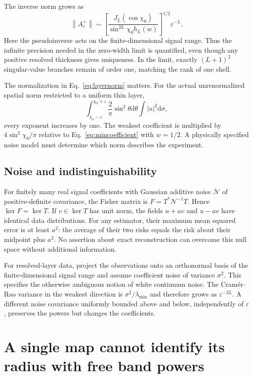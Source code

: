 \documentclass[aps,prd,reprint,amsmath,amssymb,nofootinbib,
longbibliography]{revtex4-2}
\newcommand{\dd}{\mathrm d}
\newcommand{\ee}{\varepsilon}
\newcommand{\norm}[1]{\left\lVert#1\right\rVert}
\begin{document}
The inverse norm grows as
\begin{equation}
 \norm{A_\ee^+}\sim
 \left[\frac{J_L(\cos\chi_0)}{\sin^{2L}\chi_0h_L(w)}\right]^{1/2}
 \ee^{-L}.
 \label{eq:inversecost}
\end{equation}
Here the pseudoinverse acts on the finite-dimensional signal range.
Thus the infinite precision needed in the zero-width limit is quantified,
even though any positive resolved thickness gives uniqueness.
In the limit, exactly $(L+1)^2$ singular-value branches remain of order
one, matching the rank of one shell.

The normalization in Eq.~\eqref{eq:layernorm} matters. For the actual
unrenormalized spatial norm restricted to a uniform thin layer,
\begin{equation}
 \int_{\chi_0-\ee}^{\chi_0+\ee}\frac2\pi\sin^2\theta\dd\theta
 \int|u|^2\dd\sigma,
\end{equation}
every exponent increases by one. The weakest coefficient is multiplied
by $4\sin^2\chi_0/\pi$ relative to Eq.~\eqref{eq:mincoefficient} with
$w=1/2$. A physically specified noise model must determine which norm
describes the experiment.

\subsection{Noise and indistinguishability}
\label{sec:noise}

For finitely many real signal coefficients with Gaussian additive noise
$\mathcal N$ of positive-definite covariance, the Fisher matrix is
$F=T^*\mathcal N^{-1}T$. Hence $\ker F=\ker T$. If $v\in\ker T$ has
unit norm, the fields $u+av$ and $u-av$ have identical data distributions.
For any estimator, their maximum mean squared error is at least $a^2$:
the average of their two risks equals the risk about their midpoint plus
$a^2$. No assertion about exact reconstruction can overcome this null
space without additional information.

For resolved-layer data, project the observations onto an orthonormal
basis of the finite-dimensional signal range and assume coefficient
noise of variance $\sigma^2$. This specifies the otherwise ambiguous
notion of white continuum noise. The Cram\'er--Rao variance in the weakest
direction is $\sigma^2/\lambda_{\min}$ and therefore grows as
$\ee^{-2L}$. A different noise covariance uniformly bounded above and
below, independently of $\ee$, preserves the powers but changes the
coefficients.

\section{A single map cannot identify its radius with free band powers}
\label{sec:degeneracy}
\end{document}
